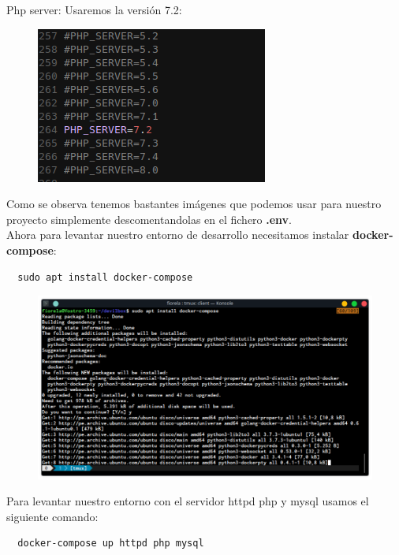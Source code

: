 \documentclass{article}
\begin{document}
Php server: Usaremos la versión 7.2:\\

\begin{figure}[h!]
  \centering
  \includegraphics[scale=0.75]{./Pictures/011_php_server.png}
\end{figure}

Como se observa tenemos bastantes imágenes que podemos usar para nuestro
proyecto simplemente descomentandolas en el fichero \textbf{.env}.\\

Ahora para levantar nuestro entorno de desarrollo necesitamos instalar
\textbf{docker-compose}:

\begin{verbatim}
  sudo apt install docker-compose
\end{verbatim}

\begin{figure}[h!]
  \centering
  \includegraphics[scale=0.65]{./Pictures/Devilbox/013_docker_compose.png}
\end{figure}

Para levantar nuestro entorno con el servidor httpd php y mysql usamos el
siguiente comando:

\begin{verbatim}
  docker-compose up httpd php mysql
\end{verbatim}
\end{document}
